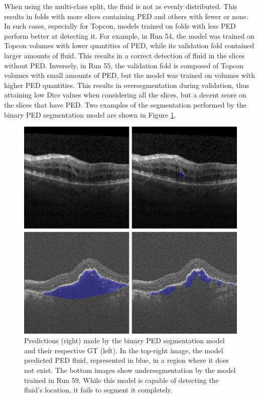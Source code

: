 When using the multi-class split, the fluid is not as evenly distributed. This results in folds with more slices containing PED and others with fewer or none. In such cases, especially for Topcon, models trained on folds with less PED perform better at detecting it. For example, in Run 54, the model was trained on Topcon volumes with lower quantities of PED, while its validation fold contained larger amounts of fluid. This results in a correct detection of fluid in the slices without PED. Inversely, in Run 55, the validation fold is composed of Topcon volumes with small amounts of PED, but the model was trained on volumes with higher PED quantities. This results in oversegmentation during validation, thus attaining low Dice values when considering all the slices, but a decent score on the slices that have PED. Two examples of the segmentation performed by the binary PED segmentation model are shown in Figure \ref{fig:Experiment2PEDSegmentation}.

\begin{figure}[!ht]
	\centering
	\includegraphics[width=0.7\linewidth]{figures/Experiment2PEDSegmentation.png}
	\caption{Predictions (right) made by the binary PED segmentation model and their respective GT (left). In the top-right image, the model predicted PED fluid, represented in blue, in a region where it does not exist. The bottom images show undersegmentation by the model trained in Run 59. While this model is capable of detecting the fluid's location, it fails to segment it completely.}
	\label{fig:Experiment2PEDSegmentation}
\end{figure}

